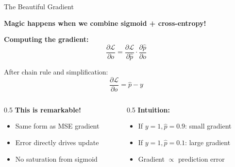 \documentclass[xcolor=svgnames, 8pt, handout, standalone]{beamer}
\newcommand{\1}{\mathbf{1}}
\begin{document}
\begin{frame}{The Beautiful Gradient}
\begin{tcolorbox}[colback=lightyellow, colframe=hotpink, boxrule=2pt]
\centering
\textbf{Magic happens when we combine sigmoid + cross-entropy!}
\end{tcolorbox}

\vspace{1em}
\textbf{Computing the gradient:}
$$\frac{\partial \mathcal{L}}{\partial o} = \frac{\partial \mathcal{L}}{\partial \hat{p}} \cdot \frac{\partial \hat{p}}{\partial o}$$

\vspace{0.5em}
After chain rule and simplification:
$$\boxed{\frac{\partial \mathcal{L}}{\partial o} = \hat{p} - y}$$

\vspace{1em}
\begin{columns}
\begin{column}{0.5\textwidth}
\textbf{This is remarkable!}
\begin{itemize}
\item Same form as MSE gradient
\item Error directly drives update
\item No saturation from sigmoid
\end{itemize}
\end{column}
\begin{column}{0.5\textwidth}
\textbf{Intuition:}
\begin{itemize}
\item If $y=1, \hat{p}=0.9$: small gradient
\item If $y=1, \hat{p}=0.1$: large gradient
\item Gradient $\propto$ prediction error
\end{itemize}
\end{column}
\end{columns}
\end{frame}
\end{document}
